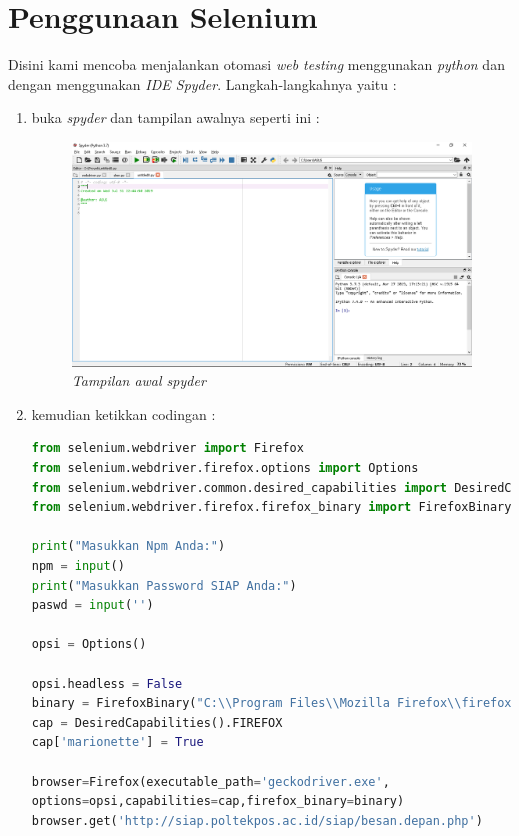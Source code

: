 \section{Penggunaan Selenium}
\par Disini kami mencoba menjalankan otomasi \textit{web testing} menggunakan \textit{python} dan dengan menggunakan \textit{IDE Spyder}.
Langkah-langkahnya yaitu :
\begin{enumerate}
\item buka \textit{spyder} dan tampilan awalnya seperti ini :
	\begin{figure}[H]
    	\centering
    	\includegraphics[scale=0.3]{figures/awalspy.png}
    	\caption{\textit{Tampilan awal spyder}}
    	\label{CLI}
	\end{figure}
	
\item kemudian ketikkan codingan :
\begin{lstlisting}[language=Python]
from selenium.webdriver import Firefox
from selenium.webdriver.firefox.options import Options
from selenium.webdriver.common.desired_capabilities import DesiredCapabilities
from selenium.webdriver.firefox.firefox_binary import FirefoxBinary

print("Masukkan Npm Anda:")
npm = input()
print("Masukkan Password SIAP Anda:")
paswd = input('')

opsi = Options()

opsi.headless = False
binary = FirefoxBinary("C:\\Program Files\\Mozilla Firefox\\firefox.exe")
cap = DesiredCapabilities().FIREFOX
cap['marionette'] = True

browser=Firefox(executable_path='geckodriver.exe',
options=opsi,capabilities=cap,firefox_binary=binary)
browser.get('http://siap.poltekpos.ac.id/siap/besan.depan.php')


\end{lstlisting}
\end{enumerate}
